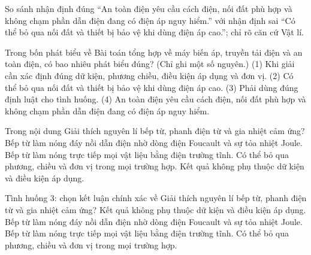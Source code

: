 \begin{bt}
So sánh nhận định đúng “An toàn điện yêu cầu cách điện, nối đất phù hợp và không chạm phần dẫn điện đang có điện áp nguy hiểm.” với nhận định sai “Có thể bỏ qua nối đất và thiết bị bảo vệ khi dùng điện áp cao.”; chỉ rõ căn cứ Vật lí.
\end{bt}

\begin{ex}
Trong bốn phát biểu về Bài toán tổng hợp về máy biến áp, truyền tải điện và an toàn điện, có bao nhiêu phát biểu đúng? (Chỉ ghi một số nguyên.) (1) Khi giải cần xác định đúng dữ kiện, phương chiều, điều kiện áp dụng và đơn vị. (2) Có thể bỏ qua nối đất và thiết bị bảo vệ khi dùng điện áp cao. (3) Phải dùng đúng định luật cho tình huống. (4) An toàn điện yêu cầu cách điện, nối đất phù hợp và không chạm phần dẫn điện đang có điện áp nguy hiểm.
\end{ex}

\begin{ex}
Trong nội dung Giải thích nguyên lí bếp từ, phanh điện từ và gia nhiệt cảm ứng?
\choice
{\True Bếp từ làm nóng đáy nồi dẫn điện nhờ dòng điện Foucault và sự tỏa nhiệt Joule.}
{Bếp từ làm nóng trực tiếp mọi vật liệu bằng điện trường tĩnh.}
{Có thể bỏ qua phương, chiều và đơn vị trong mọi trường hợp.}
{Kết quả không phụ thuộc dữ kiện và điều kiện áp dụng.}
\end{ex}

\begin{ex}
Tình huống 3: chọn kết luận chính xác về Giải thích nguyên lí bếp từ, phanh điện từ và gia nhiệt cảm ứng?
\choice
{Kết quả không phụ thuộc dữ kiện và điều kiện áp dụng.}
{\True Bếp từ làm nóng đáy nồi dẫn điện nhờ dòng điện Foucault và sự tỏa nhiệt Joule.}
{Bếp từ làm nóng trực tiếp mọi vật liệu bằng điện trường tĩnh.}
{Có thể bỏ qua phương, chiều và đơn vị trong mọi trường hợp.}
\end{ex}

